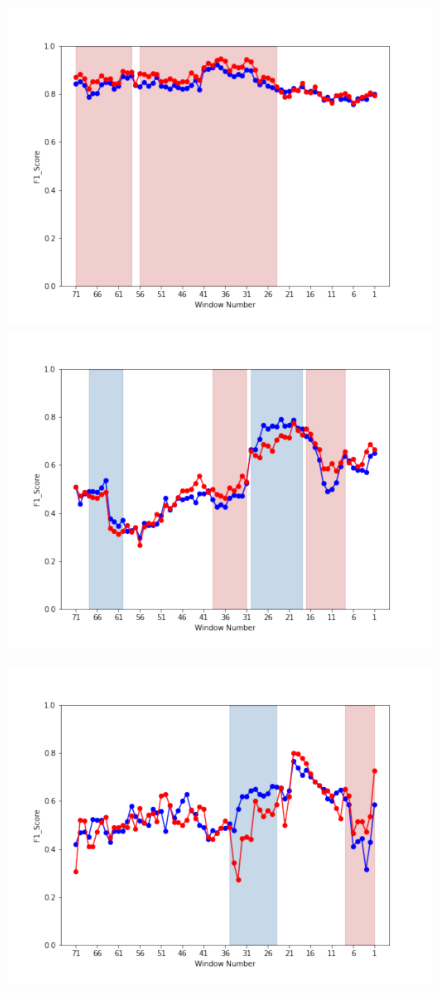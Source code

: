 \documentclass[submit]{ipsj}
\begin{document}
\begin{figure}[t]
\begin{minipage}[b]{0.65\columnwidth}
    \includegraphics[width=1\columnwidth]{Uenaka_fig/RQ2_result/Cinder/Cinder_review_F1.pdf}
    \includegraphics[width=1\columnwidth]{Uenaka_fig/RQ2_result/Keystone/Keystone_review_F1.pdf}
\end{minipage}
\begin{minipage}[b]{0.65\columnwidth}
    \centering
    \includegraphics[width=1\columnwidth]{Uenaka_fig/RQ2_result/Swift/Swift_review_F1.pdf}

\end{minipage}
\end{figure}
\end{document}
